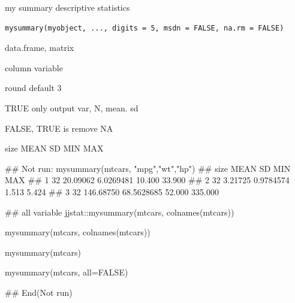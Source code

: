 \documentclass[a4paper]{book}
\begin{document}
%
\begin{Description}
my summary descriptive statistics
\end{Description}
%
\begin{Usage}
\begin{verbatim}
mysummary(myobject, ..., digits = 5, msdn = FALSE, na.rm = FALSE)
\end{verbatim}
\end{Usage}
%
\begin{Arguments}
\begin{ldescription}
\item[\code{myobject}] data.frame, matrix

\item[\code{...}] column variable

\item[\code{digits}] round default 3

\item[\code{msdn}] TRUE only output var, N, mean. sd

\item[\code{na.rm}] FALSE, TRUE is remove NA
\end{ldescription}
\end{Arguments}
%
\begin{Value}
size   MEAN    SD  MIN  MAX
\end{Value}
%
\begin{Examples}
\begin{ExampleCode}
\#\# Not run: 
mysummary(mtcars, "mpg","wt","hp")
## size      MEAN         SD    MIN     MAX
## 1   32  20.09062  6.0269481 10.400  33.900
## 2   32   3.21725  0.9784574  1.513   5.424
## 3   32 146.68750 68.5628685 52.000 335.000

## all variable
 jjstat::mysummary(mtcars, colnames(mtcars))

mysummary(mtcars, colnames(mtcars))

mysummary(mtcars)

mysummary(mtcars, all=FALSE)


## End(Not run)
\end{ExampleCode}
\end{Examples}
\end{document}
